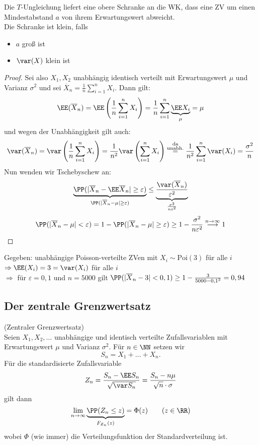  Die $T$-Ungleichung liefert eine obere Schranke an die WK, dass eine ZV um einen Mindestabstand $a$ von ihrem Erwartungswert abweicht.\\
Die Schranke ist klein, falls
\begin{itemize}
	\item $a$ groß ist
	\item $\var(X)$ klein ist
\end{itemize}

\begin{proof}
Sei also $X_1, X_2$ unabhängig identisch verteilt mit Erwartungswert $\mu$ und Varianz $\sigma^2$ und sei $\overline{X}_n=\frac{1}{n}\sum_{i=1}^nX_i$. Dann gilt:
$$ \EE(\overline{X}_n)=\EE\left(\frac{1}{n}\sum_{i=1}^nX_i\right) = \frac{1}{n}\sum_{i=1}^n\underbrace{\EE X_i}_\mu = \mu$$
und wegen der Unabhängigkeit gilt auch:
$$\var(\overline{X}_n)=\var\left(\frac{1}{n}\sum_{i=1}^n X_i\right) = \frac{1}{n^2}\var\left(\sum_{i=1}^nX_i\right) \overset{\substack{\text{da}\\\text{unabh.}}}{=}\frac{1}{n^2}\sum_{i=1}^n \var(X_i)=\frac{\sigma^2}{n}$$
Nun wenden wir Tschebyschew an:
$$\underbrace{\PP(|\overline{X}_n-\EE \overline{X}_n|\geq \varepsilon)}_{\PP(|\overline{X}_n-\mu|\geq \varepsilon)}\leq \underbrace{\frac{\var(\overline{X}_n)}{\varepsilon^2}}_{\frac{\sigma^2}{n \varepsilon^2}}$$
$$\PP(|\overline{X}_n-\mu| < \varepsilon) = 1-\PP(|\overline{X}_n-\mu | \geq \varepsilon) \geq 1-\frac{\sigma^2}{n\varepsilon^2}\overset{n\to \infty}{\longrightarrow} 1$$
\end{proof}

 Gegeben: unabhängige Poisson-verteilte ZVen mit $X_i \sim \mathrm{Poi}(3)$ für alle $i$\\
$\Rightarrow\EE (X_i) = 3 = \var(X_i)$ für alle $i$\\
$\Rightarrow$ für $\varepsilon = 0,1$ und $n=5000$ gilt $\PP(|\overline{X}_n-3|<0,1) \geq 1-\frac{3}{5000-0,1^2}=0,94$ 

\subsection{Der zentrale Grenzwertsatz}

 (Zentraler Grenzwertsatz)\\
Seien $X_1, X_2, \ldots$ unabhängige und identisch verteilte Zufallsvariablen mit Erwartungswert $\mu$ und Varianz $\sigma^2$. Für $n\in \NN$ setzen wir
$$S_n=X_1+\ldots+ X_n\text{.}$$
Für die standardisierte Zufallsvariable
$$Z_n=\frac{S_n-\EE S_n}{\sqrt{\var S_n}}=\frac{S_n - n \mu}{\sqrt{n}\cdot \sigma}$$
gilt dann
$$\lim_{n\to \infty} \underbrace{\PP(Z_n \leq z)}_{F_{Z_n}(z)} = \Phi (z) \qquad (z \in \RR)$$
wobei $\Phi$ (wie immer) die Verteilungsfunktion der Standardverteilung ist.

